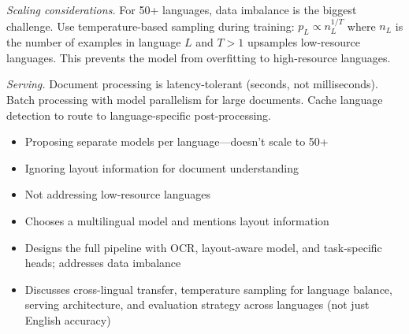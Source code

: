 \begin{interviewq}
\textit{Scaling considerations.} For 50+ languages, data imbalance is the biggest challenge. Use temperature-based sampling during training: $p_L \propto n_L^{1/T}$ where $n_L$ is the number of examples in language $L$ and $T > 1$ upsamples low-resource languages. This prevents the model from overfitting to high-resource languages.

\textit{Serving.} Document processing is latency-tolerant (seconds, not milliseconds). Batch processing with model parallelism for large documents. Cache language detection to route to language-specific post-processing.

\redflags
\begin{itemize}
    \item Proposing separate models per language---doesn't scale to 50+
    \item Ignoring layout information for document understanding
    \item Not addressing low-resource languages
\end{itemize}


\goodgreat
\begin{itemize}
    \item {} Chooses a multilingual model and mentions layout information
    \item {} Designs the full pipeline with OCR, layout-aware model, and task-specific heads; addresses data imbalance
    \item {} Discusses cross-lingual transfer, temperature sampling for language balance, serving architecture, and evaluation strategy across languages (not just English accuracy)
\end{itemize}

\end{interviewq}


